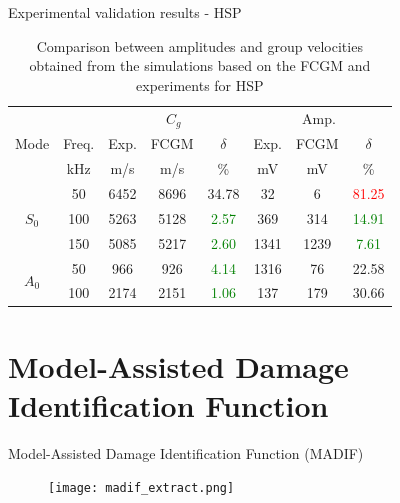 \documentclass[10pt,aspectratio=169]{beamer} %
\begin{document}
\begin{frame}[label=frame16]{Experimental validation results - HSP}
	\begin{table}
		\centering
		\caption{\label{tab:group_velocity_hsp} Comparison between amplitudes and group velocities obtained from the simulations based on the FCGM and experiments for HSP}
		\begin{tabular}{cccccccc}
			\toprule
			& & \multicolumn{3}{c}{\(C_g\)} & \multicolumn{3}{c}{Amp.}\\
			Mode & Freq. & Exp. & FCGM & \(\delta\) & Exp. & FCGM & \(\delta\)\\
			& kHz & m/s & m/s & \% & mV & mV & \%\\
			\midrule
			\multirow{3}{*}{$S_0$} & 50 & 6452 & 8696 & {34.78}& 32 & 6 & \textcolor{red}{81.25}\\
			&100& 5263 & 5128 & \textcolor{green}{2.57}& 369 & 314 & \textcolor{green}{14.91}\\
			&150& 5085 & 5217 & \textcolor{green}{2.60}& 1341 & 1239 & \textcolor{green}{7.61}\\
			\midrule
			\multirow{2}{*}{$A_0$} & 50 & 966 & 926 & \textcolor{green}{4.14} & 1316& 76 & {22.58}\\
			& 100 & 2174 & 2151 & \textcolor{green}{1.06} & 137 & 179 & {30.66}\\
			\bottomrule
		\end{tabular}
	\end{table}
\end{frame}
\section{Model-Assisted Damage Identification Function}
\begin{frame}[label=frame17]{Model-Assisted Damage Identification Function (MADIF)}
\begin{figure}
	\texttt{[image: madif\_extract.png]}
	\label{fig:madif_ectract}
\end{figure}
\end{frame}
\end{document}

